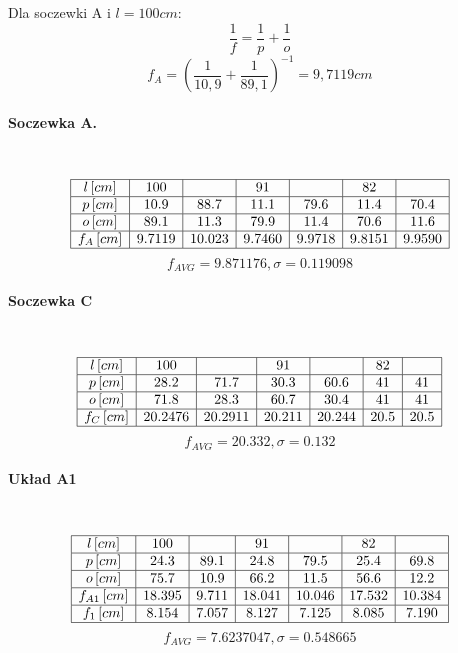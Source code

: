 \documentclass[a4paper, 11pt]{article}
\begin{document}
Dla soczewki A i $l = 100cm$:
\[
	\frac{1}{f} = \frac{1}{p} + \frac{1}{o}
\]
\[
	f_A = \left( \frac{1}{10,9} + \frac{1}{89,1} \right)^{-1} = 9,7119 cm
\]
\paragraph{Soczewka A.}\label{par:soczewka_a} %
\mbox{} \\
\[
	\begin{array}{|c|c|c|c|c|c|c|c|c|}
		\hline
		l \, [cm]   & 100    & ~      & 91     & ~      & 82     & ~      \\ \hline
		p \, [cm]   & 10.9   & 88.7   & 11.1   & 79.6   & 11.4   & 70.4   \\ \hline
		o \, [cm]   & 89.1   & 11.3   & 79.9   & 11.4   & 70.6   & 11.6   \\ \hline
		f_A \, [cm] & 9.7119 & 10.023 & 9.7460 & 9.9718 & 9.8151 & 9.9590 \\ \hline
	\end{array}
\]
$$f_{AVG} = 9.871176 , \sigma = 0.119098 $$


\paragraph{Soczewka C}\label{par:soczewka_c} %
\mbox{} \\
\[
	\begin{array}{|c|c|c|c|c|c|c|c|c|}
		\hline
		l \, [cm]   & 100     & ~       & 91     & ~      & 82   & ~    \\ \hline
		p \, [cm]   & 28.2    & 71.7    & 30.3   & 60.6   & 41   & 41   \\ \hline
		o \, [cm]   & 71.8    & 28.3    & 60.7   & 30.4   & 41   & 41   \\ \hline
		f_C \, [cm] & 20.2476 & 20.2911 & 20.211 & 20.244 & 20.5 & 20.5 \\ \hline
	\end{array}
\]
$$f_{AVG} = 20.332 , \sigma = 0.132 $$


\paragraph{Układ A1}\label{par:paragraph_name} %
\mbox{} \\
\[
	\begin{array}{|c|c|c|c|c|c|c|c|c|}
		\hline
		l \, [cm]      & 100    & ~     & 91     & ~      & 82     & ~      \\ \hline
		p \, [cm]      & 24.3   & 89.1  & 24.8   & 79.5   & 25.4   & 69.8   \\ \hline
		o \, [cm]      & 75.7   & 10.9  & 66.2   & 11.5   & 56.6   & 12.2   \\ \hline
		f_{A1} \, [cm] & 18.395 & 9.711 & 18.041 & 10.046 & 17.532 & 10.384 \\ \hline
		f_{1} \, [cm]  & 8.154  & 7.057 & 8.127  & 7.125  & 8.085  & 7.190  \\ \hline
	\end{array}
\]
$$f_{AVG} = 7.6237047, \sigma = 0.548665 $$
\end{document}
